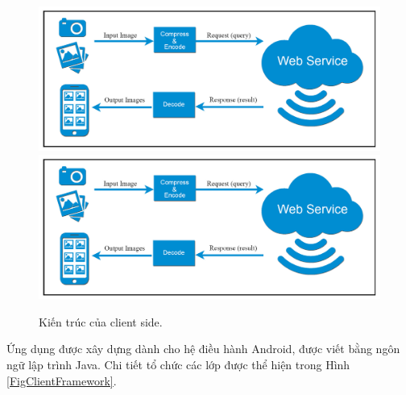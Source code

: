 {\begin{figure}[!htbp]
  \begin{center}
    \leavevmode
    \ifpdf
      \includegraphics[scale=0.25]{android_client}
    \else
      \includegraphics[scale=0.25]{android_client}
    \fi
    \caption[Kiến trúc của client side]{Kiến trúc của client side.}
    \label{FigAndroidClient}
  \end{center}
\end{figure}

Ứng dụng được xây dựng dành cho hệ điều hành Android, được viết bằng ngôn ngữ lập trình Java. Chi tiết tổ chức các lớp được thể hiện trong Hình \ref{FigClientFramework}.

}
